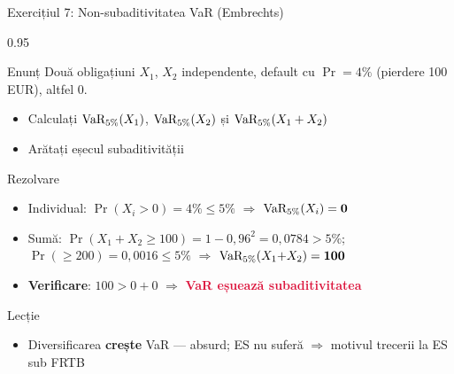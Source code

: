 \documentclass[9pt, aspectratio=169, t]{beamer}
\begin{document}
\begin{frame}[shrink=10]{Exercițiul 7: Non-subaditivitatea VaR (Embrechts)}
    \begin{cminipage}{0.95\textwidth}
    \begin{block}{Enunț}
    Două obligațiuni $X_1$, $X_2$ independente, default cu $\Pr = 4\%$ (pierdere 100 EUR), altfel 0.
    \begin{itemize}\setlength{\itemsep}{0pt}
        \item Calculați $\text{VaR}_{5\%}(X_1)$, $\text{VaR}_{5\%}(X_2)$ și $\text{VaR}_{5\%}(X_1+X_2)$
        \item Arătați eșecul subaditivității
    \end{itemize}
    \end{block}
    \vspace{0.1cm}
    \begin{exampleblock}{Rezolvare}
    \begin{itemize}\setlength{\itemsep}{0pt}
        \item Individual: $\Pr(X_i > 0) = 4\% \leq 5\%$ $\Rightarrow$ $\text{VaR}_{5\%}(X_i) = \mathbf{0}$
        \item Sumă: $\Pr(X_1{+}X_2 \geq 100) = 1 - 0{,}96^2 = 0{,}0784 > 5\%$;\, $\Pr(\geq 200) = 0{,}0016 \leq 5\%$ $\Rightarrow$ $\text{VaR}_{5\%}(X_1{+}X_2) = \mathbf{100}$
        \item \textbf{Verificare}: $100 > 0 + 0$ $\Rightarrow$ \textcolor{Crimson}{\textbf{VaR eșuează subaditivitatea}}
    \end{itemize}
    \end{exampleblock}
    \begin{alertblock}{Lecție}
    \begin{itemize}\setlength{\itemsep}{0pt}
        \item Diversificarea \textbf{crește} VaR --- absurd; ES nu suferă $\Rightarrow$ motivul trecerii la ES sub FRTB
    \end{itemize}
    \end{alertblock}
    \end{cminipage}
\end{frame}
\end{document}
